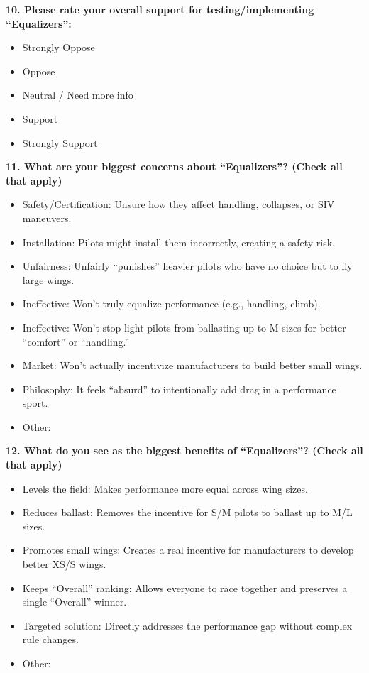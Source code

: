 \documentclass[11pt,a4paper]{article}
\begin{document}
\textbf{10. Please rate your overall support for testing/implementing ``Equalizers'':}
\begin{itemize}[label=$\square$]
    \item Strongly Oppose
    \item Oppose
    \item Neutral / Need more info
    \item Support
    \item Strongly Support
\end{itemize}

\textbf{11. What are your biggest concerns about ``Equalizers''? (Check all that apply)}
\begin{itemize}[label=$\square$]
    \item Safety/Certification: Unsure how they affect handling, collapses, or SIV maneuvers.
    \item Installation: Pilots might install them incorrectly, creating a safety risk.
    \item Unfairness: Unfairly ``punishes'' heavier pilots who have no choice but to fly large wings.
    \item Ineffective: Won't truly equalize performance (e.g., handling, climb).
    \item Ineffective: Won't stop light pilots from ballasting up to M-sizes for better ``comfort'' or ``handling.''
    \item Market: Won't actually incentivize manufacturers to build better small wings.
    \item Philosophy: It feels ``absurd'' to intentionally add drag in a performance sport.
    \item Other: \underline{\hspace{3cm}}
\end{itemize}

\textbf{12. What do you see as the biggest benefits of ``Equalizers''? (Check all that apply)}
\begin{itemize}[label=$\square$]
    \item Levels the field: Makes performance more equal across wing sizes.
    \item Reduces ballast: Removes the incentive for S/M pilots to ballast up to M/L sizes.
    \item Promotes small wings: Creates a real incentive for manufacturers to develop better XS/S wings.
    \item Keeps ``Overall'' ranking: Allows everyone to race together and preserves a single ``Overall'' winner.
    \item Targeted solution: Directly addresses the performance gap without complex rule changes.
    \item Other: \underline{\hspace{3cm}}
\end{itemize}
\end{document}
